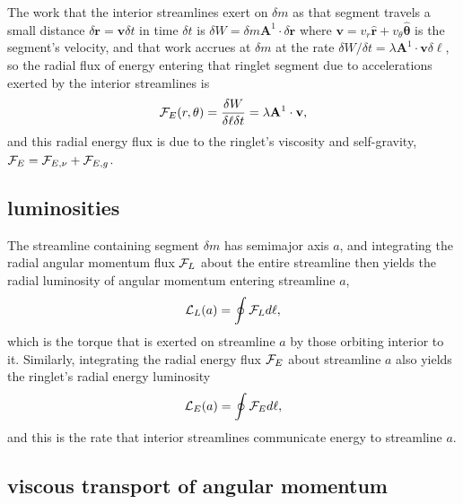 \documentclass[preprint]{aastex62}
\begin{document}
The work that the interior streamlines exert on $\delta m$ as that segment travels a small distance
$\delta\mathbf{r}=\mathbf{v}\delta t$ in time $\delta t$
is $\delta W=\delta m\mathbf{A}^1\cdot\delta\mathbf{r}$ where 
$\mathbf{v}=v_r\hat{\mathbf{r}} + v_\theta\hat{\boldsymbol\theta}$ is the segment's velocity, and
that work accrues at $\delta m$ at the rate 
$\delta W/\delta t=\lambda\mathbf{A}^1\cdot\mathbf{v}\delta\ell$,
so the radial flux of energy entering that ringlet segment due to accelerations
exerted by the interior streamlines is 
\begin{equation}
    \label{eqn:F_E}
    {\cal F}_E(r, \theta) = \frac{\delta W}{\delta\ell\delta t} = \lambda\mathbf{A}^1\cdot\mathbf{v},
\end{equation}
and this radial energy flux is due to the ringlet's viscosity and self-gravity,
${\cal F}_E = {\cal F}_{E,\nu} + {\cal F}_{E,g}$. 

\subsection{luminosities}
\label{subsec:luminosities}

The streamline containing segment $\delta m$ has semimajor axis $a$, and 
integrating the radial angular momentum flux ${\cal F}_L$ about the entire streamline
then yields the radial luminosity of angular momentum entering streamline $a$,
\begin{equation}
    \label{eqn:L_L}
    {\cal L}_L(a) = \oint {\cal F}_Ld\ell , 
\end{equation}
which is the torque that is exerted on streamline $a$ by those orbiting interior to it. Similarly,
integrating the radial energy flux ${\cal F}_E$ about streamline $a$ also yields the ringlet's radial energy luminosity
\begin{equation}
    \label{eqn:L_E}
    {\cal L}_E(a) = \oint {\cal F}_Ed\ell,
\end{equation}
and this is the rate that interior streamlines communicate energy to streamline $a$.

\subsection{viscous transport of angular momentum}
\label{subsec:viscous_flux}
\end{document}
